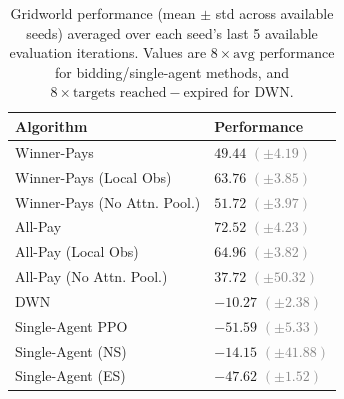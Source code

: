 \begin{table}
  \centering
  \caption{Gridworld performance (mean $\pm$ std across available seeds) averaged over each seed's last 5 available evaluation iterations. Values are $8 \times \text{avg performance}$ for bidding/single-agent methods, and $8 \times \text{targets reached} - \text{expired}$ for DWN.}
  \begin{tabular}{ll}
    \hline
    {\bf Algorithm} & {\bf Performance} \\
    \hline
    Winner-Pays & $49.44$ {\small\textcolor{gray}{$(\pm 4.19)$}} \\
    Winner-Pays (Local Obs) & $63.76$ {\small\textcolor{gray}{$(\pm 3.85)$}} \\
    Winner-Pays (No Attn. Pool.) & $51.72$ {\small\textcolor{gray}{$(\pm 3.97)$}} \\
    All-Pay & $72.52$ {\small\textcolor{gray}{$(\pm 4.23)$}} \\
    All-Pay (Local Obs) & $64.96$ {\small\textcolor{gray}{$(\pm 3.82)$}} \\
    All-Pay (No Attn. Pool.) & $37.72$ {\small\textcolor{gray}{$(\pm 50.32)$}} \\
    DWN & $-10.27$ {\small\textcolor{gray}{$(\pm 2.38)$}} \\
    Single-Agent PPO & $-51.59$ {\small\textcolor{gray}{$(\pm 5.33)$}} \\
    Single-Agent (NS) & $-14.15$ {\small\textcolor{gray}{$(\pm 41.88)$}} \\
    Single-Agent (ES) & $-47.62$ {\small\textcolor{gray}{$(\pm 1.52)$}} \\
    \hline
  \end{tabular}
  \label{tab:gridworld_methods}
\end{table}
